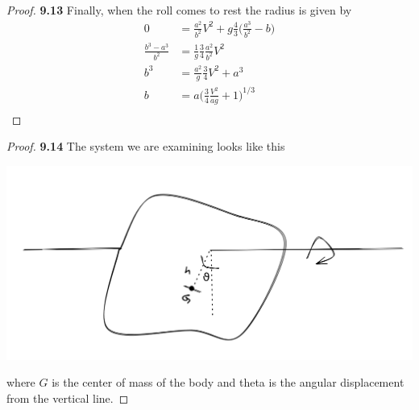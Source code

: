 \documentclass[11pt]{article}
\theoremstyle{definition}
\begin{document}
\begin{proof}{\textbf{9.13}}
        Finally, when the roll comes to rest the radius is given by
        \begin{align*}
            0 &= \frac{a^2}{b^2}V^2
            + g\frac{4}{3}\bigg(\frac{a^3}{b^2} - b\bigg)\\
            \frac{b^3 - a^3}{b^2} &= \frac{1}{g}\frac{3}{4}\frac{a^2}{b^2}V^2\\
            b^3 &= \frac{a^2}{g}\frac{3}{4}V^2 + a^3\\
            b &= a\bigg(\frac{3}{4}\frac{V^2}{ag} + 1\bigg)^{1/3}\\
        \end{align*}        
    \end{proof}
\cleardoublepage
    \begin{proof}{\textbf{9.14}}
        The system we are examining looks like this
        \begin{center}
            \includegraphics[scale=0.35]{ch9-14.png}
        \end{center}
        where $G$ is the center of mass of the body and theta is the angular
        displacement from the vertical line.


\end{proof}
\end{document}
